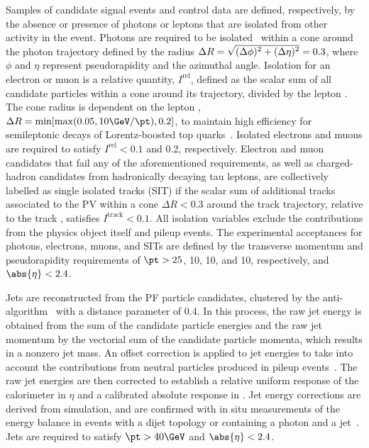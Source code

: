 Samples of candidate signal events and control data are defined,
respectively, by the absence or presence of photons or leptons that
are isolated from other activity in the event. Photons are required to
be isolated~\cite{Khachatryan:2015iwa} within a cone around the photon
trajectory defined by the radius ${\Delta}R =
\sqrt{\smash[b]{(\Delta\phi)^2 + (\Delta\eta)^2}} = 0.3$, where $\phi$
and $\eta$ represent pseudorapidity and the azimuthal angle. Isolation
for an electron or muon is a relative quantity, $I^\text{rel}$,
defined as the scalar \pt sum of all candidate particles within a cone
around its trajectory, divided by the lepton \pt. The cone radius is
dependent on the lepton \pt, ${\Delta}R = \min [ \max( 0.05, 10\GeV /
\pt ), 0.2 ]$, to maintain high efficiency for semileptonic decays of
Lorentz-boosted top quarks~\cite{Rehermann:2010vq}. Isolated electrons
and muons are required to satisfy $I^\text{rel} < 0.1$ and 0.2,
respectively.  Electron and muon candidates that fail any of the
aforementioned requirements, as well as charged-hadron candidates from
hadronically decaying tau leptons, are collectively labelled as single
isolated tracks (SIT) if the scalar \pt sum of additional tracks
associated to the PV within a cone ${\Delta}R < 0.3$ around the track
trajectory, relative to the track \pt, satisfies $I^\text{track} <
0.1$. All isolation variables exclude the contributions from the
physics object itself and pileup events. The experimental acceptances
for photons, electrons, muons, and SITs are defined by the transverse
momentum and pseudorapidity requirements of $\pt > 25$, 10, 10, and
10\GeV, respectively, and $\abs{\eta} < 2.4$.

Jets are reconstructed from the PF particle candidates, clustered by
the anti-\kt algorithm~\cite{Cacciari:2008gp, Cacciari:2011ma} with a
distance parameter of 0.4. In this process, the raw jet energy is
obtained from the sum of the candidate particle energies and the raw
jet momentum by the vectorial sum of the candidate particle momenta,
which results in a nonzero jet mass. An offset correction is applied
to jet energies to take into account the contributions from neutral
particles produced in pileup events~\cite{Cacciari:2007fd,
  CMS-PAS-JME-14-001}. The raw jet energies are then corrected to
establish a relative uniform response of the calorimeter in $\eta$ and
a calibrated absolute response in \pt. Jet energy corrections are
derived from simulation, and are confirmed with in situ measurements
of the energy balance in events with a dijet topology or containing a
photon and a jet~\cite{Khachatryan:2016kdb}. Jets are required to
satisfy $\pt > 40\GeV$ and $\abs{\eta} < 2.4$.

